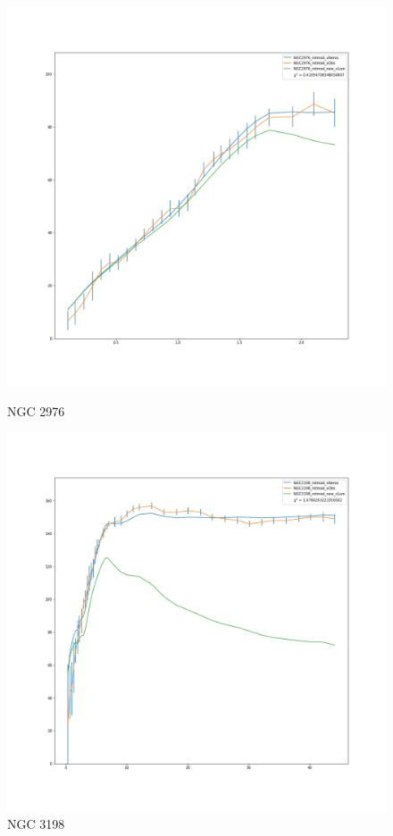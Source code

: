 \documentclass[reprint,%
 amsmath,amssymb,
 aps,
]{revtex4-1}
\begin{document}
\begin{figure} 
\centering
\begin{minipage}{0.5\textwidth}
\includegraphics[width=0.8\linewidth]{figures/NGC2976_rotmod_XueSofue.png}
\caption{NGC 2976}
\label{fig:2976}
\end{minipage}
\begin{minipage}{0.5\textwidth}
\includegraphics[width=0.8\linewidth]{figures/NGC3198_rotmod_XueSofue.png}
\caption{NGC 3198}
\label{fig:3198}
\end{minipage}
\end{figure}
  
 

    
     

 
\end{document}
